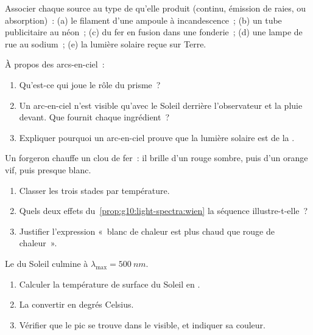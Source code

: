\begin{exercise}[$\star$]\label{exo:g10:light-spectra:3}
Associer chaque source au type de  qu'elle produit (continu,
émission de raies, ou absorption)~: (a) le filament d'une ampoule à
incandescence~; (b) un tube publicitaire au néon~; (c) du fer en fusion
dans une fonderie~; (d) une lampe de rue au sodium~; (e) la lumière
solaire reçue sur Terre.
\end{exercise}

\begin{exercise}[$\star$]\label{exo:g10:light-spectra:4}
À propos des arcs-en-ciel~:
\begin{enumerate}
  \item Qu'est-ce qui joue le rôle du prisme~?
  \item Un arc-en-ciel n'est visible qu'avec le Soleil derrière
        l'observateur et la pluie devant. Que fournit chaque
        ingrédient~?
  \item Expliquer pourquoi un arc-en-ciel prouve que la lumière solaire
        est de la .
\end{enumerate}
\end{exercise}

\begin{exercise}[$\star$]\label{exo:g10:light-spectra:5}
Un forgeron chauffe un clou de fer~: il brille d'un rouge sombre, puis
d'un orange vif, puis presque blanc.
\begin{enumerate}
  \item Classer les trois stades par température.
  \item Quels deux effets du~\cref{prop:g10:light-spectra:wien} la
        séquence illustre-t-elle~?
  \item Justifier l'expression «~blanc de chaleur est plus chaud que
        rouge de chaleur~».
\end{enumerate}
\end{exercise}

\begin{exercise}[$\star\star$]\label{exo:g10:light-spectra:6}
Le  du Soleil culmine à
$\lambda_{\max} = \qty{500}{nm}$.
\begin{enumerate}
  \item Calculer la température de surface du Soleil en .
  \item La convertir en degrés Celsius.
  \item Vérifier que le pic se trouve dans le visible, et indiquer sa
        couleur.
\end{enumerate}
\end{exercise}

